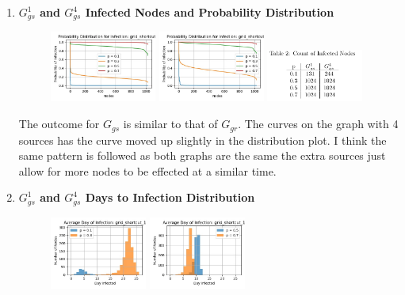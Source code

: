 \documentclass[letterpaper,9pt]{article}
\begin{document}
\begin{enumerate}
    \item \textbf{$G^{1}_{gs}$ and $G^{4}_{gs}$ Infected Nodes and Probability Distribution}

    \begin{figure}[htpb]
        \centering
        \includegraphics[width=0.33\textwidth]{pdist_grid_shortcut_1.jpg}
        \includegraphics[width=0.33\textwidth]{pdist_grid_shortcut_4.jpg}\hfill
        \includegraphics[width=0.3\textwidth]{tab2.png}
    \end{figure} 

    The outcome for $G_{gs}$ is similar to that of $G_{gr}$. The curves on the 
    graph with 4 sources has the curve moved up slightly in the distribution 
    plot. I think the same pattern is followed as both graphs are the same the 
    extra sources just allow for more nodes to be effected at a similar time.

    \item \textbf{$G^{1}_{gs}$ and $G^{4}_{gs}$ Days to Infection Distribution}



    \begin{figure}[htp]
        \centering
        \includegraphics[width=0.3\textwidth]{histogram_grid_shortcut_1_0_3.jpg}
        \includegraphics[width=0.3\textwidth]{histogram_grid_shortcut_1_0_7.jpg}
    \end{figure} 


\end{enumerate}
\end{document}
